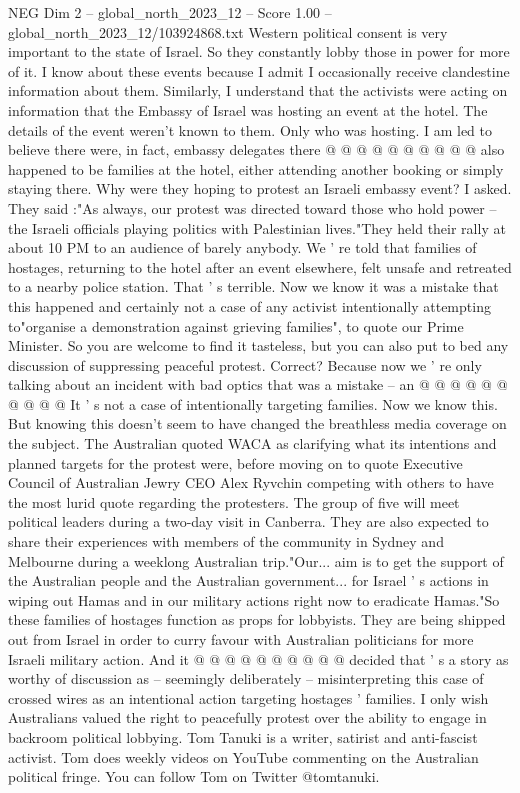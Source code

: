 \begin{textsample}{NEG Dim 2 – global\_north\_2023\_12 – Score 1.00 – global\_north\_2023\_12/103924868.txt}
Western political consent is very important to the state of Israel.
So they constantly lobby those in power for more of it.
I know about these events because I admit I occasionally receive clandestine information about them.
Similarly, I understand that the activists were acting on information that the Embassy of Israel was hosting an event at the hotel.
The details of the event weren't known to them.
Only who was hosting.
I am led to believe there were, in fact, embassy delegates there @ @ @ @ @ @ @ @ @ @ also happened to be families at the hotel, either attending another booking or simply staying there.
Why were they hoping to protest an Israeli embassy event?
I asked.
They said :"As always, our protest was directed toward those who hold power -- the Israeli officials playing politics with Palestinian lives."They held their rally at about 10 PM to an audience of barely anybody.
We ' re told that families of hostages, returning to the hotel after an event elsewhere, felt unsafe and retreated to a nearby police station.
That ' s terrible.
Now we know it was a mistake that this happened and certainly not a case of any activist intentionally attempting to"organise a demonstration against grieving families", to quote our Prime Minister.
So you are welcome to find it tasteless, but you can also put to bed any discussion of suppressing peaceful protest.
Correct?
Because now we ' re only talking about an incident with bad optics that was a mistake -- an @ @ @ @ @ @ @ @ @ @ It ' s not a case of intentionally targeting families.
Now we know this.
But knowing this doesn't seem to have changed the breathless media coverage on the subject.
The Australian quoted WACA as clarifying what its intentions and planned targets for the protest were, before moving on to quote Executive Council of Australian Jewry CEO Alex Ryvchin competing with others to have the most lurid quote regarding the protesters.
The group of five will meet political leaders during a two-day visit in Canberra.
They are also expected to share their experiences with members of the community in Sydney and Melbourne during a weeklong Australian trip."Our... aim is to get the support of the Australian people and the Australian government... for Israel ' s actions in wiping out Hamas and in our military actions right now to eradicate Hamas."So these families of hostages function as props for lobbyists.
They are being shipped out from Israel in order to curry favour with Australian politicians for more Israeli military action.
And it @ @ @ @ @ @ @ @ @ @ decided that ' s a story as worthy of discussion as -- seemingly deliberately -- misinterpreting this case of crossed wires as an intentional action targeting hostages ' families.
I only wish Australians valued the right to peacefully protest over the ability to engage in backroom political lobbying.
Tom Tanuki is a writer, satirist and anti-fascist activist.
Tom does weekly videos on YouTube commenting on the Australian political fringe.
You can follow Tom on Twitter @tomtanuki.

\end{textsample}
